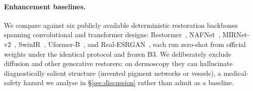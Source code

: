 \paragraph{Enhancement baselines.}
We compare against six publicly available deterministic restoration backbones
spanning convolutional and transformer designs: Restormer~\citep{zamir2022restormer},
NAFNet~\citep{chen2022simple}, MIRNet-v2~\citep{zamir2022mirnetv2},
SwinIR~\citep{liang2021swinir}, Uformer-B~\citep{wang2022uformer}, and
Real-ESRGAN~\citep{wang2021realesrgan}, each run zero-shot from official weights
under the identical protocol and frozen B3. We deliberately exclude diffusion and
other generative restorers: on dermoscopy they can hallucinate diagnostically
salient structure (invented pigment networks or vessels), a medical-safety hazard
we analyse in \S\ref{sec:discussion} rather than admit as a baseline.

